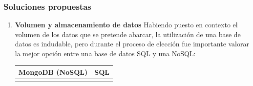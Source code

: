 \documentclass{article}
\begin{document}
\subsubsection{Soluciones propuestas}
\begin{enumerate}
\item \textbf{Volumen y almacenamiento de datos} \newline{}
Habiendo puesto en contexto el volumen de los datos que se pretende abarcar, la utilización de una base de datos es indudable, pero durante el proceso de elección fue importante valorar la mejor opción entre una base de datos SQL y una NoSQL: 
    \begin{table}[h!]
    \centering
    \begin{tabular}{p{7cm}|p{7cm}}
    \textbf{MongoDB (NoSQL)} & \textbf{SQL} \\
    \hline
    \vspace{0.025cm}


\end{tabular}
\end{table}
\end{enumerate}
\end{document}
